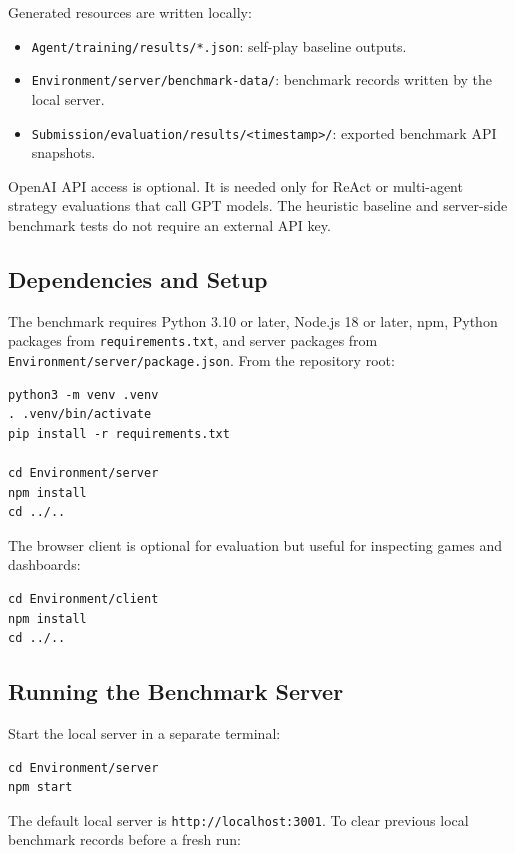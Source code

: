 \documentclass{article}
\begin{document}
Generated resources are written locally:
\begin{itemize}
    \item \texttt{Agent/training/results/*.json}: self-play baseline outputs.
    \item \texttt{Environment/server/benchmark-data/}: benchmark records written by the local server.
    \item \texttt{Submission/evaluation/results/<timestamp>/}: exported benchmark API snapshots.
\end{itemize}

OpenAI API access is optional. It is needed only for ReAct or multi-agent strategy evaluations that call GPT models. The heuristic baseline and server-side benchmark tests do not require an external API key.

\subsection{Dependencies and Setup}

The benchmark requires Python 3.10 or later, Node.js 18 or later, npm, Python packages from \texttt{requirements.txt}, and server packages from \texttt{Environment/server/package.json}. From the repository root:

\begin{verbatim}
python3 -m venv .venv
. .venv/bin/activate
pip install -r requirements.txt

cd Environment/server
npm install
cd ../..
\end{verbatim}

The browser client is optional for evaluation but useful for inspecting games and dashboards:

\begin{verbatim}
cd Environment/client
npm install
cd ../..
\end{verbatim}

\subsection{Running the Benchmark Server}

Start the local server in a separate terminal:

\begin{verbatim}
cd Environment/server
npm start
\end{verbatim}

The default local server is \texttt{http://localhost:3001}. To clear previous local benchmark records before a fresh run:
\end{document}
